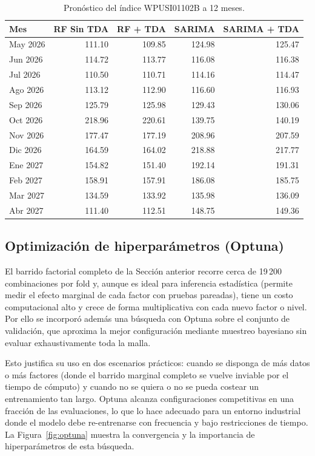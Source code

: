 \documentclass[11pt,a4paper]{article}
\begin{document}
\begin{table}[H]
  \centering
  \caption{Pronóstico del índice WPUSI01102B a 12 meses.}
  \label{tab:forecast}
  \small
  \begin{tabular}{lrrrr}
    \toprule
    Mes & RF Sin TDA & RF + TDA & SARIMA & SARIMA + TDA \\
    \midrule
    May 2026 & 111.10 & 109.85 & 124.98 & 125.47 \\
    Jun 2026 & 114.72 & 113.77 & 116.08 & 116.38 \\
    Jul 2026 & 110.50 & 110.71 & 114.16 & 114.47 \\
    Ago 2026 & 113.12 & 112.90 & 116.60 & 116.93 \\
    Sep 2026 & 125.79 & 125.98 & 129.43 & 130.06 \\
    Oct 2026 & 218.96 & 220.61 & 139.75 & 140.19 \\
    Nov 2026 & 177.47 & 177.19 & 208.96 & 207.59 \\
    Dic 2026 & 164.59 & 164.02 & 218.88 & 217.77 \\
    Ene 2027 & 154.82 & 151.40 & 192.14 & 191.31 \\
    Feb 2027 & 158.91 & 157.91 & 186.08 & 185.75 \\
    Mar 2027 & 134.59 & 133.92 & 135.98 & 136.09 \\
    Abr 2027 & 111.40 & 112.51 & 148.75 & 149.36 \\
    \bottomrule
  \end{tabular}
\end{table}

\subsection{Optimización de hiperparámetros (Optuna)}
El barrido factorial completo de la Sección anterior recorre cerca de 19\,200
combinaciones por fold y, aunque es ideal para inferencia estadística (permite
medir el efecto marginal de cada factor con pruebas pareadas), tiene un costo
computacional alto y crece de forma multiplicativa con cada nuevo factor o nivel.
Por ello se incorporó además una búsqueda con Optuna sobre el conjunto de
validación, que aproxima la mejor configuración mediante muestreo bayesiano sin
evaluar exhaustivamente toda la malla.

Esto justifica su uso en dos escenarios prácticos: cuando se disponga de más
datos o más factores (donde el barrido marginal completo se vuelve inviable por
el tiempo de cómputo) y cuando no se quiera o no se pueda costear un
entrenamiento tan largo. Optuna alcanza configuraciones competitivas en una
fracción de las evaluaciones, lo que lo hace adecuado para un entorno industrial
donde el modelo debe re-entrenarse con frecuencia y bajo restricciones de tiempo.
La Figura~\ref{fig:optuna} muestra la convergencia y la importancia de
hiperparámetros de esta búsqueda.
\end{document}
